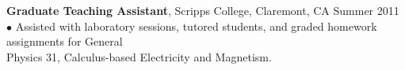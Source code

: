 \documentclass[10pt]{article}
\begin{document}
{\bf  Graduate Teaching Assistant}, Scripps College, Claremont, CA \hfill Summer 2011\\
\hspace*{10pt}$\bullet$ Assisted with laboratory sessions, tutored students, and graded homework assignments for General\\ \hspace*{15pt} Physics 31, Calculus-based Electricity and Magnetism. \\


%
%
%
%
\end{document}
